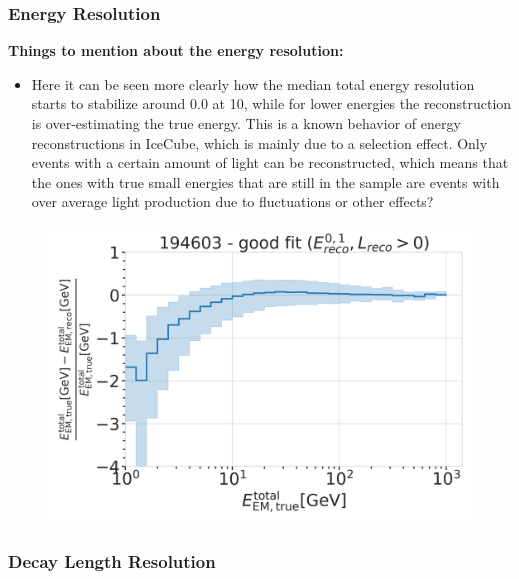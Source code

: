 \subsubsection{Energy Resolution}

\textbf{Things to mention about the energy resolution:}
\begin{itemize}
    \item Here it can be seen more clearly how the median total energy resolution starts to stabilize around 0.0 at \SI{10}{\gev}, while for lower energies the reconstruction is over-estimating the true energy. This is a known behavior of energy reconstructions in IceCube, which is mainly due to a selection effect. Only events with a certain amount of light can be reconstructed, which means that the ones with true small energies that are still in the sample are events with over average light production due to fluctuations or other effects?
\end{itemize}

\begin{figure}[h]
	\centering
    \includegraphics{figures/model_independent_simulation/results/realistic/resolutions/194603_fractional_reco_total_energy_error_goodfit.png}
    \caption[]{}
\end{figure}


\subsubsection{Decay Length Resolution}

